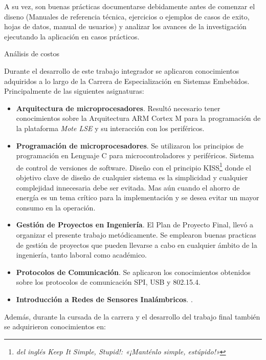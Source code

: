 A su vez, son buenas prácticas documentarse debidamente antes de comenzar el diseno (Manuales de referencia técnica, ejercicios o ejemplos de casos de exito, hojas de datos, manual de usuarios) y analizar los avances de la investigación ejecutando la aplicación en casos prácticos.

Análisis de costos


\medskip
Durante el desarrollo de este trabajo integrador se aplicaron conocimientos adquiridos a lo largo de la Carrera de Especialización en Sistemas Embebidos. Principalmente de las siguientes asignaturas: 

\begin{itemize}
\item
\textbf{Arquitectura de microprocesadores}. Resultó necesario tener conocimientos sobre la Arquitectura ARM Cortex M para la programación de la plataforma \textit{Mote LSE} y su interacción con los periféricos.

\item
\textbf{Programación de microprocesadores}. Se utilizaron los principios de programación en Lenguaje C para microcontroladores y periféricos. Sistema de control de versiones de software. Diseño con el principio KISS\footnote{\textit{del inglés Keep It Simple, Stupid!: «¡Manténlo simple, estúpido!»}} donde el objetivo clave de diseño de cualquier sistema es la simplicidad y cualquier complejidad innecesaria debe ser evitada. Mas aún cuando el ahorro de energía es un tema crítico para la implementación y se desea evitar un mayor consumo en la operación. 

\item
\textbf{Gestión de Proyectos en Ingeniería}. El Plan de Proyecto Final, llevó a organizar el presente trabajo metódicamente. Se emplearon buenas practicas de gestión de proyectos que pueden llevarse a cabo en cualquier ámbito de la ingeniería, tanto laboral como académico.

\item 
\textbf{Protocolos de Comunicación}. Se aplicaron los conocimientos obtenidos sobre los protocolos de comunicación SPI, USB y 802.15.4.

\item 
\textbf{Introducción a Redes de Sensores Inalámbricos}. .
\end{itemize}

\medskip

\noindent Además, durante la cursada de la carrera y el desarrollo del trabajo final también se adquirieron conocimientos en:

